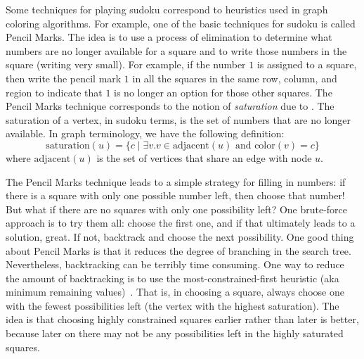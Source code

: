 \documentclass[7x10]{TimesAPriori_MIT}%
\numberwithin{theorem}{chapter}
\numberwithin{definition}{chapter}
\numberwithin{equation}{chapter}
\begin{document}
Some techniques for playing sudoku correspond to heuristics used in
graph coloring algorithms.  For example, one of the basic techniques
for sudoku is called Pencil Marks. The idea is to use a process of
elimination to determine what numbers are no longer available for a
square and to write those numbers in the square (writing very
small). For example, if the number $1$ is assigned to a square, then
write the pencil mark $1$ in all the squares in the same row, column,
and region to indicate that $1$ is no longer an option for those other
squares.
%
The Pencil Marks technique corresponds to the notion of
\emph{saturation} due to \citet{Brelaz:1979eu}.  The
saturation of a vertex, in sudoku terms, is the set of numbers that
are no longer available. In graph terminology, we have the following
definition:
\begin{equation*}
  \mathrm{saturation}(u) = \{ c \;|\; \exists v. v \in \mathrm{adjacent}(u)
     \text{ and } \mathrm{color}(v) = c \}
\end{equation*}
where $\mathrm{adjacent}(u)$ is the set of vertices that share an
edge with node $u$.

The Pencil Marks technique leads to a simple strategy for filling in
numbers: if there is a square with only one possible number left, then
choose that number! But what if there are no squares with only one
possibility left? One brute-force approach is to try them all: choose
the first one, and if that ultimately leads to a solution, great.  If
not, backtrack and choose the next possibility.  One good thing about
Pencil Marks is that it reduces the degree of branching in the search
tree. Nevertheless, backtracking can be terribly time consuming. One
way to reduce the amount of backtracking is to use the
most-constrained-first heuristic (aka minimum remaining
values)~\citep{Russell2003}.  That is, in choosing a square, always
choose one with the fewest possibilities left (the vertex with the
highest saturation).  The idea is that choosing highly constrained
squares earlier rather than later is better, because later on there may
not be any possibilities left in the highly saturated squares.
\end{document}
